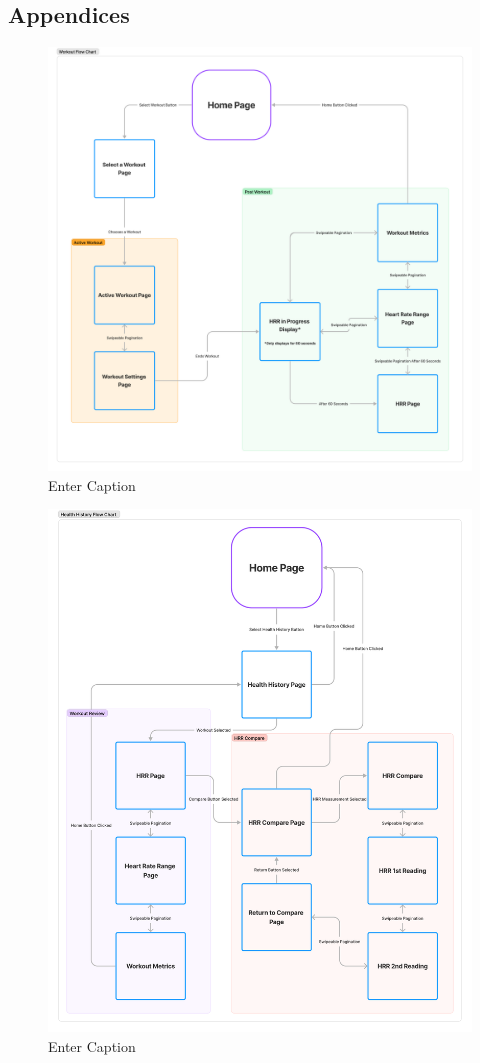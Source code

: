 \documentclass{l4proj}
\begin{document}
\begin{appendices}

\chapter{Appendices}

\begin{figure}[h!]
    \centering
    \includegraphics[width=0.75\linewidth]{dissertation//dissImages/WorkoutFlow.pdf}
    \caption{Enter Caption}
    \label{fig:enter-label}
\end{figure}

\begin{figure}[h!]
    \centering
    \includegraphics[width=0.75\linewidth]{dissertation//dissImages/HealthHistoryFlow.pdf}
    \caption{Enter Caption}
    \label{fig:enter-label}
\end{figure}


\end{appendices}
\end{document}
